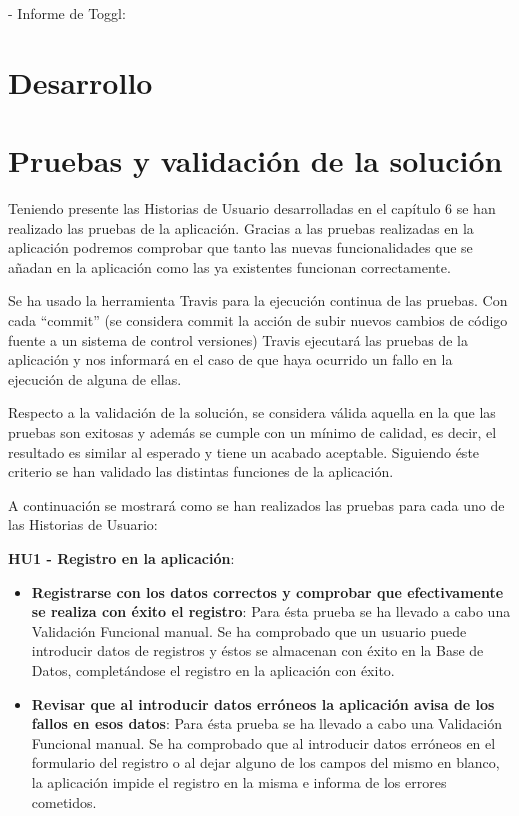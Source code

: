 \documentclass[11pt,openany]{book}
\begin{document}
- Informe de Toggl:



\chapter{Desarrollo}


\chapter{Pruebas y validación de la solución}

Teniendo presente las Historias de Usuario desarrolladas en el capítulo 6 se han realizado las pruebas de la aplicación. Gracias a las pruebas realizadas en la aplicación podremos comprobar que tanto las nuevas funcionalidades que se añadan en la aplicación como las ya existentes funcionan correctamente.

Se ha usado la herramienta Travis para la ejecución continua de las pruebas. Con cada ``commit'' (se considera commit la acción de subir nuevos cambios de código fuente a un sistema de control versiones) Travis ejecutará las pruebas de la aplicación y nos informará en el caso de que haya ocurrido un fallo en la ejecución de alguna de ellas.

Respecto a la validación de la solución, se considera válida aquella en la que las pruebas son exitosas y además se cumple con un mínimo de calidad, es decir, el resultado es similar al esperado y tiene un acabado aceptable. Siguiendo éste criterio se han validado las distintas funciones de la aplicación. 

A continuación se mostrará como se han realizados las pruebas para cada uno de las Historias de Usuario:

\textbf{HU1 - Registro en la aplicación}:

\begin{itemize}
\item\textbf{Registrarse con los datos correctos y comprobar que efectivamente se realiza con éxito el registro}: Para ésta prueba se ha llevado a cabo una Validación Funcional manual. Se ha comprobado que un usuario puede introducir datos de registros y éstos se almacenan con éxito en la Base de Datos, completándose el registro en la aplicación con éxito.
\item\textbf{Revisar que al introducir datos erróneos la aplicación avisa de los fallos en esos datos}: Para ésta prueba se ha llevado a cabo una Validación Funcional manual. Se ha comprobado que al introducir datos erróneos en el formulario del registro o al dejar alguno de los campos del mismo en blanco, la aplicación impide el registro en la misma e informa de los errores cometidos.
\end{itemize}
\end{document}

